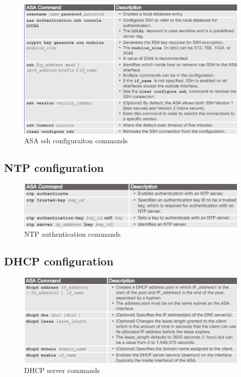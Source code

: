 \begin{figure}[hbtp]
\caption{ASA ssh configuraiton commands}\label{SSHconfigASA}
\centering
\includegraphics[scale=0.5]{pictures/SSHconfigASA.PNG}
\end{figure}

\subsection{NTP configuration}

\begin{figure}[hbtp]
\caption{NTP authentication commands}
\centering
\includegraphics[scale=0.5]{pictures/NTPauthentication.PNG}
\end{figure}

\subsection{DHCP configuration}

\begin{figure}[hbtp]
\caption{DHCP server commands}\label{DHCPcommandList}
\centering
\includegraphics[scale=0.5]{pictures/DHCPcommandList.PNG}
\end{figure}


